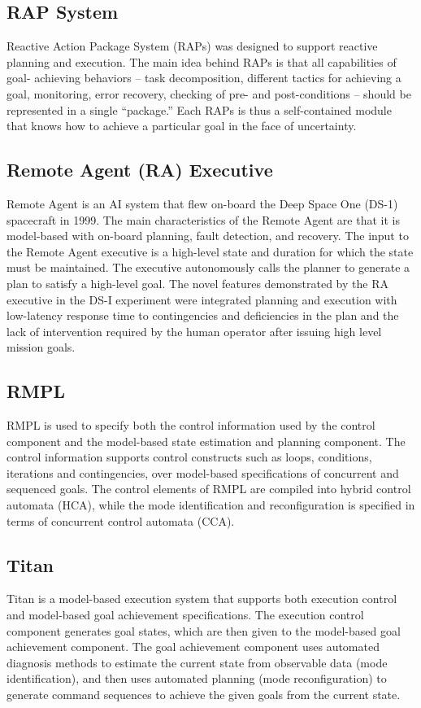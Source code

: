 \documentclass[conference]{IEEEtran}
\begin{document}
\subsection{\textbf{RAP System}}\label{sec:rap}
Reactive Action Package System (RAPs) was designed to support reactive planning and execution. 
The main idea behind RAPs is that all capabilities of goal- achieving behaviors – task decomposition, different tactics for achieving a goal, monitoring, error recovery, checking of pre- and post-conditions – should be represented in a single “package.” Each RAPs is thus a self-contained module that knows how to achieve a particular goal in the face of uncertainty.

\subsection{\textbf{Remote Agent (RA) Executive}}\label{sec:ra}
Remote Agent is an AI system that flew on-board the Deep Space One (DS-1) spacecraft in 1999. The main characteristics of the Remote Agent are that it is model-based with on-board planning, fault detection, and recovery. The input to the Remote Agent executive is a high-level state and duration for which the state must be maintained. The executive autonomously calls the planner to generate a plan to satisfy a high-level goal. The novel features demonstrated by the RA executive in the DS-I experiment were integrated planning and execution with low-latency response time to contingencies and deficiencies in the plan and the lack of intervention required by the human operator after issuing high level mission goals. 

\subsection{\textbf{RMPL}}\label{sec:rmpl}
RMPL is used to specify both the control information used by the control component and the model-based state estimation and planning component. The control information supports control constructs such as loops, conditions, iterations and contingencies, over model-based specifications of concurrent and sequenced goals. The control elements of RMPL are compiled into hybrid control automata (HCA), while the mode identification and reconfiguration is specified in terms of concurrent control automata (CCA).

\subsection{\textbf{Titan}}\label{sec:titan}
Titan is a model-based execution system that supports both execution control and model-based goal achievement specifications. The execution control component generates goal states, which are then given to the model-based goal achievement component. The goal achievement component uses automated diagnosis methods to estimate the current state from observable data (mode identification), and then uses automated planning (mode reconfiguration) to generate command sequences to achieve the given goals from the current state.
\end{document}
